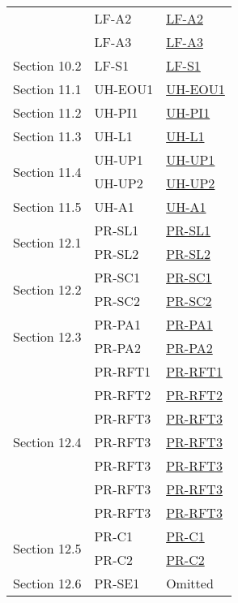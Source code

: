 \documentclass[12pt, titlepage]{article}
\begin{document}
\begin{longtable}{|p{3cm}|p{4cm}|p{4cm}|}
  \cline{2-3}
  & LF-A2 & \hyperref[LF]{LF-A2} \\
  \cline{2-3}
  & LF-A3 & \hyperref[LF]{LF-A3} \\
  \hline
  \multirow{1}{3cm}{Section 10.2} 
  & LF-S1 & \hyperref[LF]{LF-S1} \\
  \hline
  \multirow{1}{3cm}{Section 11.1} 
  & UH-EOU1 & \hyperref[UH]{UH-EOU1} \\
  \hline
  \multirow{1}{3cm}{Section 11.2} 
  & UH-PI1 & \hyperref[UH]{UH-PI1} \\
  \hline
  \multirow{1}{3cm}{Section 11.3} 
  & UH-L1 & \hyperref[UH]{UH-L1} \\
  \hline
  \multirow{2}{3cm}{Section 11.4} 
  & UH-UP1 & \hyperref[UH]{UH-UP1} \\
  \cline{2-3}
  & UH-UP2 & \hyperref[UH]{UH-UP2} \\
  \hline
  \multirow{1}{3cm}{Section 11.5} 
  & UH-A1 & \hyperref[UH]{UH-A1} \\
  \hline
  \multirow{2}{3cm}{Section 12.1} 
  & PR-SL1 & \hyperref[PR]{PR-SL1} \\
  \cline{2-3}
  & PR-SL2 & \hyperref[PR]{PR-SL2} \\
  \hline
  \multirow{2}{3cm}{Section 12.2} 
  & PR-SC1 & \hyperref[PR]{PR-SC1} \\
  \cline{2-3}
  & PR-SC2 & \hyperref[PR]{PR-SC2} \\
  \hline
  \multirow{2}{3cm}{Section 12.3} 
  & PR-PA1 & \hyperref[PR]{PR-PA1} \\
  \cline{2-3}
  & PR-PA2 & \hyperref[PR]{PR-PA2} \\
  \hline
  \multirow{7}{3cm}{Section 12.4} 
  & PR-RFT1 & \hyperref[PR]{PR-RFT1} \\
  \cline{2-3}
  & PR-RFT2 & \hyperref[PR]{PR-RFT2} \\
  \cline{2-3}
  & PR-RFT3 & \hyperref[PR]{PR-RFT3} \\
  \cline{2-3}
  & PR-RFT3 & \hyperref[PR]{PR-RFT3} \\
  \cline{2-3}
  & PR-RFT3 & \hyperref[PR]{PR-RFT3} \\
  \cline{2-3}
  & PR-RFT3 & \hyperref[PR]{PR-RFT3} \\
  \cline{2-3}
  & PR-RFT3 & \hyperref[PR]{PR-RFT3} \\
  \hline
  \multirow{2}{3cm}{Section 12.5} 
  & PR-C1 & \hyperref[PR]{PR-C1} \\
  \cline{2-3}
  & PR-C2 & \hyperref[PR]{PR-C2} \\
  \hline
  \multirow{3}{3cm}{Section 12.6} 
  & PR-SE1 & Omitted \\

\end{longtable}
\end{document}
